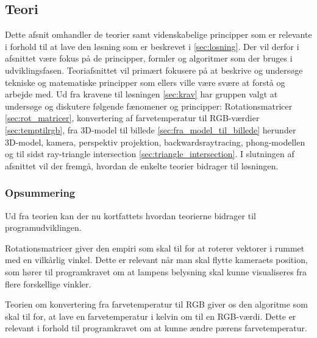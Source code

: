 \subsection{Teori}
\label{sec:teori}

Dette afsnit omhandler de teorier samt videnskabelige principper som er relevante i forhold til at lave den løsning som er beskrevet i \ref{sec:losning}. Der vil derfor i afsnittet være fokus på de principper, formler og algoritmer som der bruges i udviklingsfasen. Teoriafsnittet vil primært fokusere på at beskrive og undersøge tekniske og matematiske principper som ellers ville være svære at forstå og arbejde med. Ud fra kravene til løsningen \ref{sec:krav} har gruppen valgt at undersøge og diskutere følgende fænomener og principper: Rotationsmatricer \ref{sec:rot_matricer}, konvertering af farvetemperatur til RGB-værdier \ref{sec:temptilrgb}, fra 3D-model til billede \ref{sec:fra_model_til_billede} herunder 3D-model, kamera, perspektiv projektion, backwardsraytracing, phong-modellen og til sidst ray-triangle intersection \ref{sec:triangle_intersection}. I slutningen af afsnittet vil der fremgå, hvordan de enkelte teorier bidrager til løsningen.











\subsubsection*{Opsummering}

Ud fra teorien kan der nu kortfattets hvordan teorierne bidrager til programudviklingen. 

Rotationsmatricer giver den empiri som skal til for at roterer vektorer i rummet med en vilkårlig vinkel. Dette er relevant når man skal flytte kameraets position, som hører til programkravet om at lampens belysning skal kunne visualiseres fra flere forskellige vinkler.

Teorien om konvertering fra farvetemperatur til RGB giver os den algoritme som skal til for, at lave en farvetemperatur i kelvin om til en RGB-værdi. Dette er relevant i forhold til programkravet om at kunne ændre pærens farvetemperatur. 

